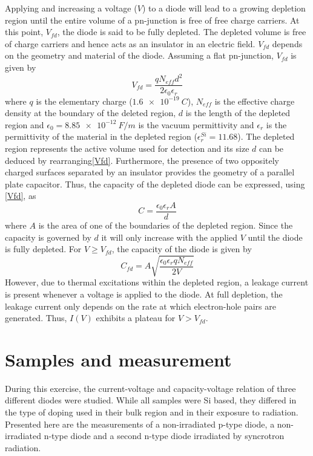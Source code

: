 \documentclass[11pt]{article}
\begin{document}
Applying and increasing a voltage ($V$) to a diode will lead to a growing depletion region until the entire volume of a pn-junction is free of free charge carriers.
At this point, $V_{fd}$, the diode is said to be fully depleted.
The depleted volume is free of charge carriers and hence acts as an insulator in an electric field. $V_{fd}$ depends on the geometry and material of the diode.
Assuming a flat pn-junction, $V_{fd}$ is given by
\begin{equation}
  \label{Vfd}
  V_{fd} = \frac{qN_{eff}d^2}{2\epsilon_0\epsilon_r}
\end{equation}
where $q$ is the elementary charge ($\SI{1.6e-19}{C}$), $N_{eff}$ is the effective charge density at the boundary of the deleted region, $d$ is the length of the depleted region and $\epsilon_0 = \SI{8.85e-12}{F/m}$ is the vacuum permittivity and $\epsilon_r$ is the permittivity of the material in the depleted region ($\epsilon_r^{Si} = 11.68$).
The depleted region represents the active volume used for detection and its size $d$ can be deduced by rearranging\eqref{Vfd}. 
Furthermore, the presence of two oppositely charged surfaces separated by an insulator provides the geometry of a parallel plate capacitor. Thus, the capacity of the depleted diode can be expressed, using \eqref{Vfd}, as
\begin{equation}
  \label{C}
  C = \frac{\epsilon_{0}\epsilon_{r}A}{d}
\end{equation}
where $A$ is the area of one of the boundaries of the depleted region. Since the capacity is governed by $d$ it will only increase with the applied $V$ until the diode is fully depleted. For $V \geq V_{fd}$, the capacity of the diode is given by
\begin{equation}
  \label{eq:1}
   C_{fd} = A \sqrt{\frac{\epsilon_0\epsilon_rqN_{eff}}{2V}}
\end{equation}
However, due to thermal excitations within the depleted region, a leakage current is present whenever a voltage is applied to the diode.
At full depletion, the leakage current only depends on the rate at which electron-hole pairs are generated. Thus, $I(V)$ exhibits a plateau for $V>V_{fd}$.

\section{Samples and measurement}
\label{sec:samples}
During this exercise, the current-voltage and capacity-voltage relation of three different diodes were studied. While all samples were Si based, they differed in the type of doping used in their bulk region and in their exposure to radiation.
Presented here are the measurements of a non-irradiated p-type diode, a non-irradiated n-type diode and a second n-type diode irradiated by syncrotron radiation. 
\end{document}
